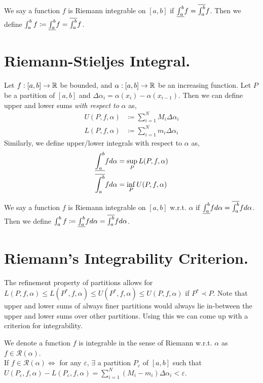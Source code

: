 \begin{definition}
We say a function $f$ is Riemann integrable on $[a,b]$ if $\underline{\int_{a}^{b}}f=\overline{\int_{a}^{b}}f$. 
Then we define $\int^b_a f\coloneqq \underline{\int_{a}^{b}}f=\overline{\int_{a}^{b}}f$.
\end{definition}

\section{Riemann-Stieljes Integral.}
Let $f:[a,b]\to \mathbb{R}$ be bounded, and $\alpha:[a,b]\to\mathbb{R}$ be an increasing function.
Let $P$ be a partition of $[a,b]$ and $\Delta\alpha_i=\alpha(x_i)-\alpha(x_{i-1})$.
Then we can define upper and lower sums \emph{with respect to} $\alpha$ as,
\begin{equation}
\begin{split}
U(P,f,\alpha)&\coloneqq\sum^N_{i=1} M_i\Delta\alpha_i\\
L(P,f,\alpha)&\coloneqq\sum^N_{i=1} m_i\Delta\alpha_i
\end{split}
\end{equation}
Similarly, we define upper/lower integrals with respect to $\alpha$ as,
\begin{equation}
\begin{split}
\underline{\int_{a}^{b}}f d\alpha &= \sup_{P}L(P,f,\alpha)\\
\overline{\int_{a}^{b}}f d\alpha&= \inf_{P}U(P,f,\alpha)
\end{split}
\end{equation}
\begin{definition}
We say a function $f$ is Riemann integrable on $[a,b]$ w.r.t. $\alpha$ if $\underline{\int_{a}^{b}}fd\alpha=\overline{\int_{a}^{b}}fd\alpha$. 
Then we define $\int^b_a f\coloneqq \underline{\int_{a}^{b}}fd\alpha=\overline{\int_{a}^{b}}fd\alpha$.
\end{definition}

\section{Riemann's Integrability Criterion.}
The refinement property of partitions allows for $L(P,f,\alpha)\leq L(P^*,f,\alpha)\leq U(P^*,f,\alpha)\leq U(P,f,\alpha)$ if $P^*\prec P$.
Note that upper and lower sums of always finer partitions would always lie in-between the upper and lower sums over other partitions.
Using this we can come up with a criterion for integrability.
\begin{theorem}
We denote a function $f$ is integrable in the sense of Riemann w.r.t. $\alpha$ as $f\in \mathcal{R}(\alpha)$.\\
If $f\in\mathcal{R}(\alpha)\iff$ for any $\varepsilon,\,\exists$ a partition $P_\varepsilon$ of $[a,b]$ such that $U(P_\varepsilon,f,\alpha)-L(P_\varepsilon,f,\alpha) = \sum^N_{i=1}(M_i-m_i)\Delta\alpha_i<\varepsilon$.
\end{theorem}

